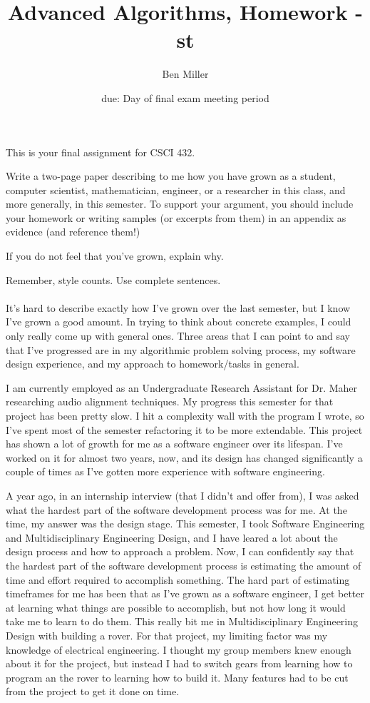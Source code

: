 \documentclass{article}
\title{Advanced Algorithms, Homework \hwnum -st}
\author{Ben Miller}
\date{due: Day of final exam meeting period}
\begin{document}
\maketitle

This is your final assignment for CSCI 432.

Write a two-page paper describing to me how you have grown as a student,
computer scientist, mathematician, engineer, or a researcher in this class, and
more generally, in this semester.  To support your argument, you should include
your homework or writing samples (or excerpts from them) in an appendix as
evidence (and reference them!)

If you do not feel that you've grown, explain why.

Remember, style counts. Use complete sentences.

\paragraph{}

It's hard to describe exactly how I've grown over the last semester, but I know I've grown a good amount. In trying to think about concrete examples, I could only really come up with general ones. Three areas that I can point to and say that I've progressed are in my algorithmic problem solving process, my software design experience, and my approach to homework/tasks in general.

I am currently employed as an Undergraduate Research Assistant for Dr. Maher researching audio alignment techniques. My progress this semester for that project has been pretty slow. I hit a complexity wall with the program I wrote, so I've spent most of the semester refactoring it to be more extendable. This project has shown a lot of growth for me as a software engineer over its lifespan. I've worked on it for almost two years, now, and its design has changed significantly a couple of times as I've gotten more experience with software engineering.

A year ago, in an internship interview (that I didn't and offer from), I was asked what the hardest part of the software development process was for me. At the time, my answer was the design stage. This semester, I took Software Engineering and Multidisciplinary Engineering Design, and I have leared a lot about the design process and how to approach a problem. Now, I can confidently say that the hardest part of the software development process is estimating the amount of time and effort required to accomplish something. The hard part of estimating timeframes for me has been that as I've grown as a software engineer, I get better at learning what things are possible to accomplish, but not how long it would take me to learn to do them. This really bit me in Multidisciplinary Engineering Design with building a rover. For that project, my limiting factor was my knowledge of electrical engineering. I thought my group members knew enough about it for the project, but instead I had to switch gears from learning how to program an the rover to learning how to build it. Many features had to be cut from the project to get it done on time.
\end{document}
